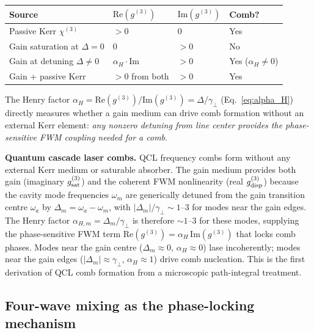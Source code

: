 \documentclass[12pt]{article}
\begin{document}
\begin{center}
\begin{tabular}{llll}
\toprule
Source & $\mathrm{Re}(g^{(3)})$ & $\mathrm{Im}(g^{(3)})$ & Comb?\\
\midrule
Passive Kerr $\chi^{(3)}$ & $> 0$ & $0$ & Yes\\
Gain saturation at $\Delta=0$ & $0$ & $> 0$ & No\\
Gain at detuning $\Delta\neq 0$ & $\alpha_H\cdot\mathrm{Im}$ & $> 0$ & Yes ($\alpha_H\neq 0$)\\
Gain + passive Kerr & $> 0$ from both & $> 0$ & Yes\\
\bottomrule
\end{tabular}
\end{center}

The Henry factor $\alpha_H = \mathrm{Re}(g^{(3)})/\mathrm{Im}(g^{(3)})
= \Delta/\gamma_\perp$ (Eq.~\ref{eq:alpha_H}) directly measures whether
a gain medium can drive comb formation without an external Kerr element:
\emph{any nonzero detuning from line center provides the phase-sensitive
FWM coupling needed for a comb}.

\begin{remark}
\textbf{Quantum cascade laser combs.}
QCL frequency combs \cite{Hugi2012} form without any external Kerr medium
or saturable absorber.  The gain medium provides both gain (imaginary
$g^{(3)}_{\rm sat}$) and the coherent FWM nonlinearity (real
$g^{(3)}_{\rm disp}$) because the cavity mode frequencies $\omega_m$
are generically detuned from the gain transition centre $\omega_a$ by
$\Delta_m = \omega_a - \omega_m$, with $|\Delta_m|/\gamma_\perp\sim 1$--$3$
for modes near the gain edges.  The Henry factor $\alpha_{H,m} = \Delta_m/\gamma_\perp$
is therefore $\sim 1$--$3$ for these modes, supplying the phase-sensitive
FWM term $\mathrm{Re}(g^{(3)}) = \alpha_H\,\mathrm{Im}(g^{(3)})$ that locks
comb phases.  Modes near the gain centre ($\Delta_m\approx 0$, $\alpha_H\approx 0$)
lase incoherently; modes near the gain edges ($|\Delta_m|\approx\gamma_\perp$,
$\alpha_H\approx 1$) drive comb nucleation.  This is the first derivation
of QCL comb formation from a microscopic path-integral treatment.
\end{remark}

\subsection{Four-wave mixing as the phase-locking mechanism}
\end{document}
